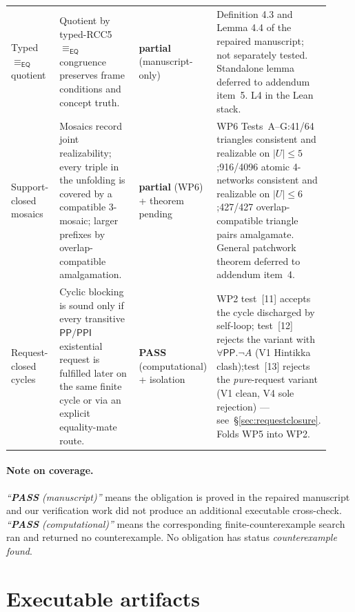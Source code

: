 \documentclass[11pt]{article}
\newcommand{\EQ}{\mathsf{EQ}}
\newcommand{\PP}{\mathsf{PP}}
\newcommand{\PPI}{\mathsf{PPI}}
\newcommand{\eqrel}{\equiv_{\EQ}}
\newcommand{\PASS}{\textcolor{black!70!green}{\textbf{PASS}}}
\newcommand{\PARTIAL}{\textcolor{black!60!orange}{\textbf{partial}}}
\begin{document}
\begin{center}
\begin{longtable}{p{0.18\linewidth} p{0.40\linewidth} p{0.13\linewidth} p{0.21\linewidth}}
Typed \(\eqrel\) quotient
  & Quotient by typed-RCC5 \(\eqrel\) congruence preserves frame
    conditions and concept truth.
  & \PARTIAL{} (manuscript-only)
  & Definition 4.3 and Lemma 4.4 of the repaired manuscript; not
    separately tested.  Standalone lemma deferred to addendum
    item~5.  L4 in the Lean stack. \\

Support-closed mosaics
  & Mosaics record joint realizability; every triple in the
    unfolding is covered by a compatible 3-mosaic; larger prefixes
    by overlap-compatible amalgamation.
  & \PARTIAL{} (WP6) + theorem pending
  & WP6 Tests~A--G:\@ 41/64 triangles consistent and realizable on
    \(|U|\le 5\);\@ 916/4096 atomic 4-networks consistent and
    realizable on \(|U|\le 6\);\@ 427/427 overlap-compatible
    triangle pairs amalgamate.  General patchwork theorem
    deferred to addendum item~4. \\

Request-closed cycles
  & Cyclic blocking is sound only if every transitive
    \(\PP/\PPI\) existential request is fulfilled later on the
    same finite cycle or via an explicit equality-mate route.
  & \PASS{} (computational) + isolation
  & WP2 test~[11] accepts the cycle discharged by self-loop;\@
    test~[12] rejects the variant with \(\forall\PP.\neg A\)
    (V1 Hintikka clash);\@ test~[13] rejects the
    \emph{pure}-request variant (V1 clean, V4 sole rejection)
    --- see~\S\ref{sec:requestclosure}.  Folds WP5 into WP2. \\

\end{longtable}
\end{center}

\paragraph{Note on coverage.}
\emph{``\PASS{} (manuscript)''} means the obligation is proved in
the repaired manuscript and our verification work did not produce
an additional executable cross-check.  \emph{``\PASS{}
(computational)''} means the corresponding finite-counterexample
search ran and returned no counterexample.  No obligation has
status \emph{counterexample found}.

\section{Executable artifacts}
\end{document}
